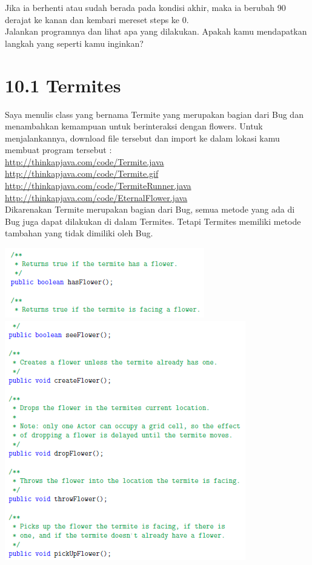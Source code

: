 \documentclass{article}
\begin{document}
	Jika ia berhenti atau sudah berada pada kondisi akhir, maka ia berubah 90 derajat ke kanan dan kembari mereset steps ke 0.
	\\
	
	Jalankan programnya dan lihat apa yang dilakukan. Apakah kamu mendapatkan langkah yang seperti kamu inginkan?
	\\
	
	\section*{10.1 Termites}
	Saya menulis class yang bernama Termite yang merupakan bagian dari Bug dan menambahkan kemampuan untuk berinteraksi dengan flowers. Untuk menjalankannya, download file tersebut dan import ke dalam lokasi kamu membuat program tersebut : 
	\\
	
	\url{http://thinkapjava.com/code/Termite.java}
	\url{http://thinkapjava.com/code/Termite.gif}
	\url{http://thinkapjava.com/code/TermiteRunner.java}
	\url{http://thinkapjava.com/code/EternalFlower.java}
	\\
	
	Dikarenakan Termite merupakan bagian dari Bug, semua metode yang ada di Bug juga dapat dilakukan di dalam Termites. Tetapi Termites memiliki metode tambahan yang tidak dimiliki oleh Bug.
	\newpage
	
	\includegraphics{D1}
	\\
	\includegraphics{D2}
	\\
	
\end{document}
